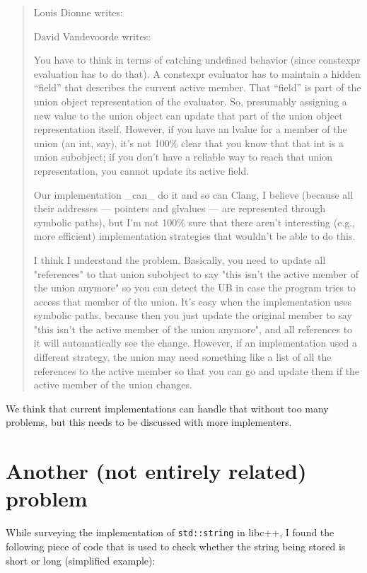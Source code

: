\documentclass{wg21}
\newcommand{\cc}[1]{\texttt{#1}}
\begin{document}
\begin{quote}
Louis Dionne writes:\\
\begin{leftbar}
  David Vandevoorde writes:\\
  \begin{leftbar}
  You have to think in terms of catching undefined behavior (since constexpr evaluation has to do that). A constexpr evaluator has to maintain a hidden “field” that describes the current active member.  That “field” is part of the union object representation of the evaluator.  So, presumably assigning a new value to the union object can update that part of the union object representation itself.  However, if you have an lvalue for a member of the union (an int, say), it’s not 100\% clear that you know that that int is a union subobject; if you don’t have a reliable way to reach that union representation, you cannot update its active field.

  Our implementation _can_ do it and so can Clang, I believe (because all their addresses — pointers and glvalues — are represented through symbolic paths), but I’m not 100\% sure that there aren’t interesting (e.g., more efficient) implementation strategies that wouldn’t be able to do this.
  \end{leftbar}

I think I understand the problem. Basically, you need to update all "references" to that union subobject to say "this isn't the active member of the union anymore" so you can detect the UB in case the program tries to access that member of the union. It's easy when the implementation uses symbolic paths, because then you just update the original member to say "this isn't the active member of the union anymore", and all references to it will automatically see the change. However, if an implementation used a different strategy, the union may need something like a list of all the references to the active member so that you can go and update them if the active member of the union changes.
\end{leftbar}
\end{quote}

We think that current implementations can handle that without too many problems,
but this needs to be discussed with more implementers.


\section{Another (not entirely related) problem}
While surveying the implementation of \cc{std::string} in libc++, I found the
following piece of code that is used to check whether the string being stored
is short or long (simplified example):
\end{document}
